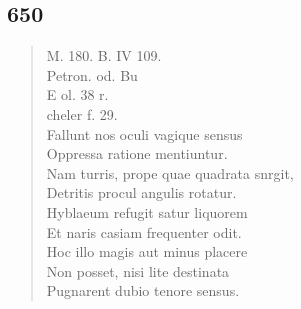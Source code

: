 \documentclass[11pt, a4paper]{report}
\begin{document}
            \subsection*{650}
      \begin{verse}
      M. 180. B. IV 109. \\ Petron. od. Bu \\ E ol. 38 r. \\ cheler f. 29. \\ Fallunt nos oculi vagique sensus \\ Oppressa ratione mentiuntur. \\ Nam turris, prope quae quadrata snrgit, \\ Detritis procul angulis rotatur. \\ Hyblaeum refugit satur liquorem \\ Et naris casiam frequenter odit. \\ Hoc illo magis aut minus placere \\ Non posset, nisi lite destinata \\ Pugnarent dubio tenore sensus. \\ 
      \end{verse}
  
\end{document}
